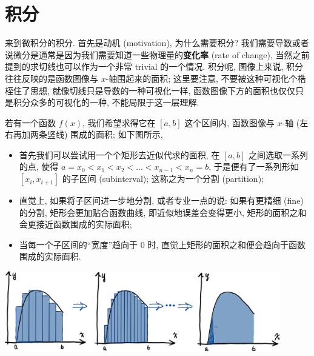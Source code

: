 \section{积分}\label{017}

来到微积分的积分. 首先是动机 (motivation), 为什么需要积分?
我们需要导数或者说微分是通常是因为我们需要知道一些物理量的\textbf{变化率}
(rate of change), 当然之前提到的求切线也可以作为一个非常 trivial
的一个情况. 积分呢, 图像上来说, 积分往往反映的是函数图像与
\(x\)-轴围起来的面积; 这里要注意, 不要被这种可视化个梏桎住了思想,
就像切线只是导数的一种可视化一样,
函数图像下方的面积也仅仅只是积分众多的可视化的一种,
不能局限于这一层理解.

\begin{tcolorbox}[size=fbox, breakable, enhanced jigsaw, title={积分 (integration)}]

若有一个函数 \(f(x)\), 我们希望求得它在 \([a,b]\) 这个区间内, 函数图像与
\(x\)-轴 (左右再加两条竖线) 围成的面积; 如下图所示,

\begin{itemize}
\item
  首先我们可以尝试用一个个矩形去近似代求的面积, 在 \([a,b]\)
  之间选取一系列的点, 使得 \(a=x_0<x_1<x_2<...<x_{n-1}<x_{n}=b\),
  于是便有了一系列形如 \([x_i,x_{i+1}]\) 的子区间 (subinterval);
  这称之为一个分割 (partition);
\item
  直觉上, 如果将子区间进一步地分割, 或者专业一点的说: 如果有更精细
  (fine) 的分割, 矩形会更加贴合函数曲线, 即近似地误差会变得更小,
  矩形的面积之和会更接近函数围成的实际面积;
\item
  当每一个子区间的``宽度''趋向于 \(0\) 时,
  直觉上矩形的面积之和便会趋向于函数围成的实际面积.
\end{itemize}


\begin{tcolorbox}[size=fbox, breakable, enhanced jigsaw]
\includegraphics[width=0.9\textwidth]{img/image-20230906163643414.png}

\end{tcolorbox}


\end{tcolorbox}
